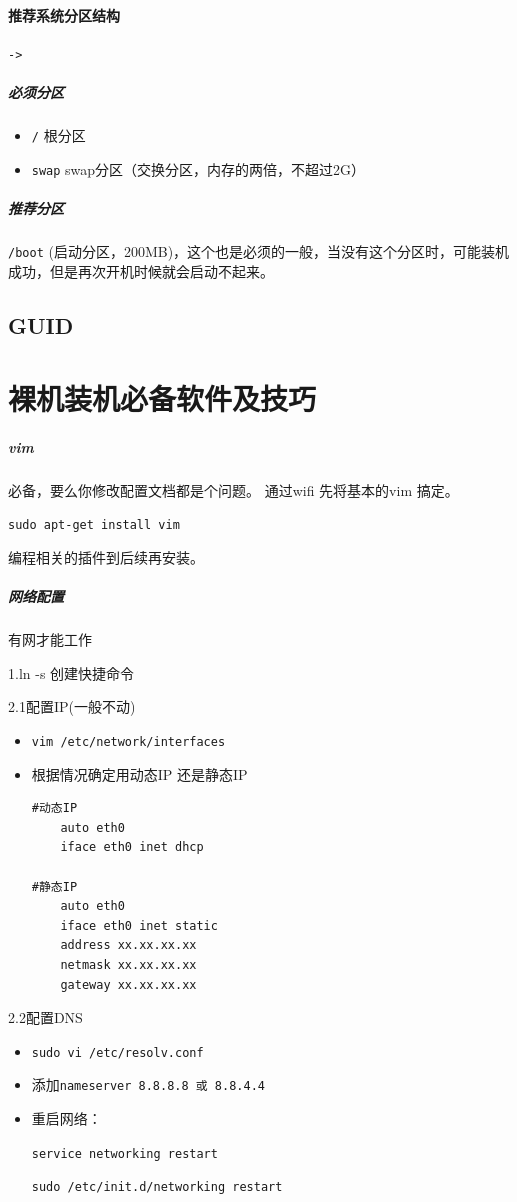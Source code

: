 \documentclass[UTF8,a4paper,12pt]{ctexbook}
\begin{document}
				\paragraph{推荐系统分区结构}\verb|->|
				\subparagraph{必须分区}
					\begin{itemize}[itemindent = 1em]
						\item \verb|/| 根分区
						\item \verb|swap| swap分区（交换分区，内存的两倍，不超过2G）
					\end{itemize}
					
				\subparagraph{推荐分区}\verb|/boot| (启动分区，200MB)，这个也是必须的一般，当没有这个分区时，可能装机成功，但是再次开机时候就会启动不起来。
				
				
				
			\subsection{GUID}
	\section{裸机装机必备软件及技巧}
	
		\subparagraph{vim}必备，要么你修改配置文档都是个问题。
			通过wifi 先将基本的vim 搞定。
			
			\verb|sudo apt-get install vim|
			
			编程相关的插件到后续再安装。
			
		\subparagraph{网络配置}有网才能工作
			
			1.ln -s 创建快捷命令
			
			2.1配置IP(一般不动)
			\begin{itemize}[itemindent = 1em]
				\item \verb|vim /etc/network/interfaces|
				\item 根据情况确定用动态IP 还是静态IP 
				\begin{lstlisting}
#动态IP 
	auto eth0
	iface eth0 inet dhcp
	
#静态IP
	auto eth0
	iface eth0 inet static
	address xx.xx.xx.xx
	netmask xx.xx.xx.xx
	gateway xx.xx.xx.xx
				\end{lstlisting}
			\end{itemize}
			
			2.2配置DNS
			\begin{itemize}[itemindent = 1em]
				\item \verb|sudo vi /etc/resolv.conf|
				\item 添加\verb|nameserver 8.8.8.8 或 8.8.4.4|
				\item 重启网络：
				
				\verb|service networking restart|
				
				\verb|sudo /etc/init.d/networking restart|
			\end{itemize}
			
\end{document}

